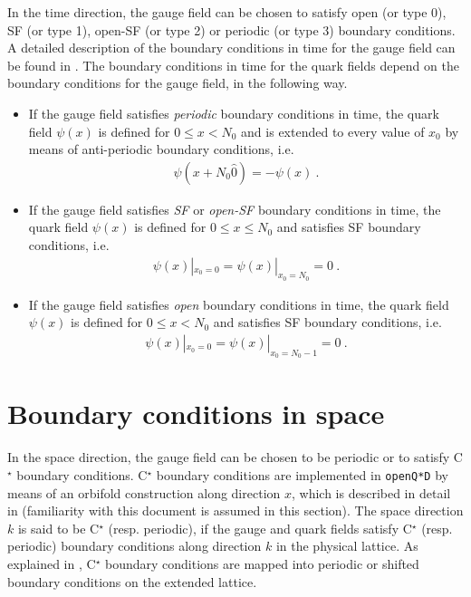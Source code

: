 \documentclass[11pt,fleqn]{article}
\begin{document}
In the time direction, the gauge field can be chosen to satisfy open (or type 0), SF (or type 1), open-SF (or type 2) or periodic (or type 3) boundary conditions. A detailed description of the boundary conditions in time for the gauge field can be found in \cite{gauge_action,openQCD:gauge_action}. The boundary conditions in time for the quark fields depend on the boundary conditions for the gauge field, in the following way.
\begin{itemize}
   \item If the gauge field satisfies \textit{periodic} boundary conditions in time, the quark field $\psi(x)$ is defined for $0 \le x < N_0$ and is extended to every value of $x_0$ by means of anti-periodic boundary conditions, i.e.
   \begin{gather}
      \psi(x+N_0 \hat{0}) = - \psi(x) \ .
   \end{gather}
   
   \item If the gauge field satisfies \textit{SF} or \textit{open-SF} boundary conditions in time, the quark field $\psi(x)$ is defined for $0 \le x \le N_0$ and satisfies SF boundary conditions, i.e.
   \begin{gather}
      \psi(x)|_{x_0=0} = \psi(x)|_{x_0=N_0} = 0 \ .
   \end{gather}
   
   \item If the gauge field satisfies \textit{open} boundary conditions in time, the quark field $\psi(x)$ is defined for $0 \le x < N_0$ and satisfies SF boundary conditions, i.e.
   \begin{gather}
      \psi(x)|_{x_0=0} = \psi(x)|_{x_0=N_0-1} = 0 \ .
   \end{gather}
\end{itemize}


\section{Boundary conditions in space}

In the space direction, the gauge field can be chosen to be periodic or to satisfy C$^\star$ boundary conditions. C$^\star$ boundary conditions are implemented in \texttt{openQ*D} by means of an orbifold construction along direction $x$, which is described in detail in \cite{cstar} (familiarity with this document is assumed in this section). The space direction $k$ is said to be C$^\star$ (resp. periodic), if the gauge and quark fields satisfy C$^\star$ (resp. periodic) boundary conditions along direction $k$ in the physical lattice. As explained in \cite{cstar}, C$^\star$ boundary conditions are mapped into periodic or shifted boundary conditions on the extended lattice. 
\end{document}
